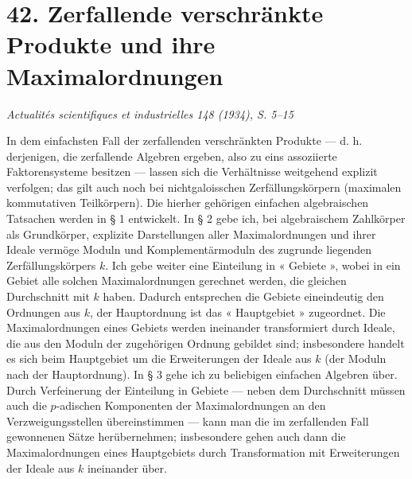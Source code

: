 \section*{42. Zerfallende verschränkte Produkte und ihre Maximalordnungen}

\begin{center}
\emph{Actualités scientifiques et industrielles 148 (1934), S. 5--15}
\end{center}

In dem einfachsten Fall der zerfallenden verschränkten Produkte --- d. h. derjenigen, die zerfallende Algebren ergeben, also zu eins assoziierte Faktorensysteme besitzen --- lassen sich die Verhältnisse weitgehend explizit verfolgen; das gilt auch noch bei nichtgaloisschen Zerfällungskörpern (maximalen kommutativen Teilkörpern). Die hierher gehörigen einfachen algebraischen Tatsachen werden in § 1 entwickelt. In § 2 gebe ich, bei algebraischem Zahlkörper als Grundkörper, explizite Darstellungen aller Maximalordnungen und ihrer Ideale vermöge Moduln und Komplementärmoduln des zugrunde liegenden Zerfällungskörpers $k$. Ich gebe weiter eine Einteilung in « Gebiete », wobei in ein Gebiet alle solchen Maximalordnungen gerechnet werden, die gleichen Durchschnitt mit $k$ haben. Dadurch entsprechen die Gebiete eineindeutig den Ordnungen aus $k$, der Hauptordnung ist das « Hauptgebiet » zugeordnet. Die Maximalordnungen eines Gebiets werden ineinander transformiert durch Ideale, die aus den Moduln der zugehörigen Ordnung gebildet sind; insbesondere handelt es sich beim Hauptgebiet um die Erweiterungen der Ideale aus $k$ (der Moduln nach der Hauptordnung). In § 3 gehe ich zu beliebigen einfachen Algebren über. Durch Verfeinerung der Einteilung in Gebiete --- neben dem Durchschnitt müssen auch die $p$-adischen Komponenten der Maximalordnungen an den Verzweigungsstellen übereinstimmen --- kann man die im zerfallenden Fall gewonnenen Sätze herübernehmen; insbesondere gehen auch dann die Maximalordnungen eines Hauptgebiets durch Transformation mit Erweiterungen der Ideale aus $k$ ineinander über.

